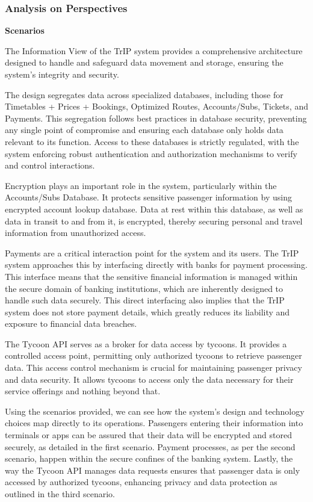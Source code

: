 \subsubsection{Analysis on Perspectives}
\textbf{Scenarios}
\scenarioOneInformation
\scenarioTwoInformation
\scenarioThreeInformation

\noindent The Information View of the TrIP system provides a comprehensive architecture designed to handle and safeguard data movement and storage, ensuring the system's integrity and security.

The design segregates data across specialized databases, including those for Timetables + Prices + Bookings, Optimized Routes, Accounts/Subs, Tickets, and Payments. This segregation follows best practices in database security, preventing any single point of compromise and ensuring each database only holds data relevant to its function. Access to these databases is strictly regulated, with the system enforcing robust authentication and authorization mechanisms to verify and control interactions.

Encryption plays an important role in the system, particularly within the Accounts/Subs Database. It protects sensitive passenger information by using encrypted account lookup database. Data at rest within this database, as well as data in transit to and from it, is encrypted, thereby securing personal and travel information from unauthorized access.

Payments are a critical interaction point for the system and its users. The TrIP system approaches this by interfacing directly with banks for payment processing. This interface means that the sensitive financial information is managed within the secure domain of banking institutions, which are inherently designed to handle such data securely. This direct interfacing also implies that the TrIP system does not store payment details, which greatly reduces its liability and exposure to financial data breaches.

The Tycoon API serves as a broker for data access by tycoons. It provides a controlled access point, permitting only authorized tycoons to retrieve passenger data. This access control mechanism is crucial for maintaining passenger privacy and data security. It allows tycoons to access only the data necessary for their service offerings and nothing beyond that.

Using the scenarios provided, we can see how the system's design and technology choices map directly to its operations. Passengers entering their information into terminals or apps can be assured that their data will be encrypted and stored securely, as detailed in the first scenario. Payment processes, as per the second scenario, happen within the secure confines of the banking system. Lastly, the way the Tycoon API manages data requests ensures that passenger data is only accessed by authorized tycoons, enhancing privacy and data protection as outlined in the third scenario.

